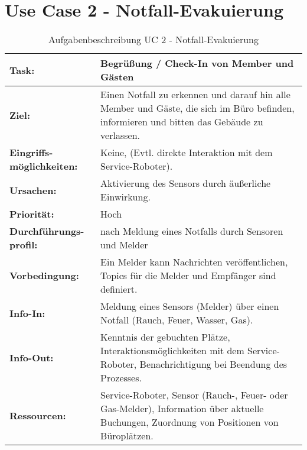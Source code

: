 \section*{Use Case 2 - Notfall-Evakuierung}
\begin{table}[hbt!]
    \begin{center}
        \begin{tabular}{| p{3cm} | p{12.75cm} | }
            \hline
                \textbf{Task:} & \textbf{Begrüßung / Check-In von Member und Gästen} \\
            \hline
                \textbf{Ziel:} & Einen Notfall zu erkennen und darauf hin alle Member und Gäste, die sich im Büro befinden, informieren und bitten das Gebäude zu verlassen. \\
            \hline
                \textbf{Eingriffs-möglichkeiten:} & Keine, (Evtl. direkte Interaktion mit dem Service-Roboter). \\
            \hline
                \textbf{Ursachen:} & Aktivierung des Sensors durch äußerliche Einwirkung. \\
            \hline
                \textbf{Priorität:} & Hoch \\
            \hline
                \textbf{Durchführungs-profil:} & nach Meldung eines Notfalls durch Sensoren und Melder \\ 
            \hline
                \textbf{Vorbedingung:} & Ein Melder kann Nachrichten veröffentlichen, Topics für die Melder und Empfänger sind definiert. \\
            \hline 
                \textbf{Info-In:} & Meldung eines Sensors (Melder) über einen Notfall (Rauch, Feuer, Wasser, Gas). \\
            \hline
                \textbf{Info-Out:} & Kenntnis der gebuchten Plätze, Interaktionsmöglichkeiten mit dem Service-Roboter, Benachrichtigung bei Beendung des Prozesses. \\
            \hline
                \textbf{Ressourcen:} & Service-Roboter, Sensor (Rauch-, Feuer- oder Gas-Melder), Information über aktuelle Buchungen, Zuordnung von Positionen von Büroplätzen. \\
            \hline
        \end{tabular}
    \end{center}
    \caption{Aufgabenbeschreibung UC 2 - Notfall-Evakuierung}
    \label{tab:evacuation}
\end{table}

